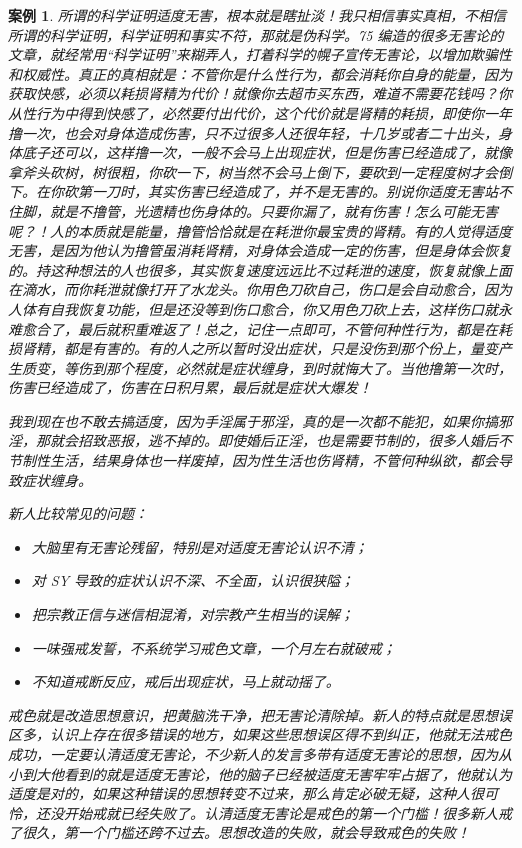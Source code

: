 \documentclass{ctexart}
\newtheorem{case}{案例}
\begin{document}
\begin{case}
    所谓的科学证明适度无害，根本就是瞎扯淡！我只相信事实真相，不相信所谓的科学证明，科学证明和事实不符，那就是伪科学。75 编造的很多无害论的文章，就经常用“科学证明”来糊弄人，打着科学的幌子宣传无害论，以增加欺骗性和权威性。真正的真相就是：不管你是什么性行为，都会消耗你自身的能量，因为获取快感，必须以耗损肾精为代价！就像你去超市买东西，难道不需要花钱吗？你从性行为中得到快感了，必然要付出代价，这个代价就是肾精的耗损，即使你一年撸一次，也会对身体造成伤害，只不过很多人还很年轻，十几岁或者二十出头，身体底子还可以，这样撸一次，一般不会马上出现症状，但是伤害已经造成了，就像拿斧头砍树，树很粗，你砍一下，树当然不会马上倒下，要砍到一定程度树才会倒下。在你砍第一刀时，其实伤害已经造成了，并不是无害的。别说你适度无害站不住脚，就是不撸管，光遗精也伤身体的。只要你漏了，就有伤害！怎么可能无害呢？！人的本质就是能量，撸管恰恰就是在耗泄你最宝贵的肾精。有的人觉得适度无害，是因为他认为撸管虽消耗肾精，对身体会造成一定的伤害，但是身体会恢复的。持这种想法的人也很多，其实恢复速度远远比不过耗泄的速度，恢复就像上面在滴水，而你耗泄就像打开了水龙头。你用色刀砍自己，伤口是会自动愈合，因为人体有自我恢复功能，但是还没等到伤口愈合，你又用色刀砍上去，这样伤口就永难愈合了，最后就积重难返了！总之，记住一点即可，不管何种性行为，都是在耗损肾精，都是有害的。有的人之所以暂时没出症状，只是没伤到那个份上，量变产生质变，等伤到那个程度，必然就是症状缠身，到时就悔大了。当他撸第一次时，伤害已经造成了，伤害在日积月累，最后就是症状大爆发！

    我到现在也不敢去搞适度，因为手淫属于邪淫，真的是一次都不能犯，如果你搞邪淫，那就会招致恶报，逃不掉的。即使婚后正淫，也是需要节制的，很多人婚后不节制性生活，结果身体也一样废掉，因为性生活也伤肾精，不管何种纵欲，都会导致症状缠身。

    新人比较常见的问题：

    \begin{itemize}
        \item 大脑里有无害论残留，特别是对适度无害论认识不清；
        \item 对 SY 导致的症状认识不深、不全面，认识很狭隘；
        \item 把宗教正信与迷信相混淆，对宗教产生相当的误解；
        \item 一味强戒发誓，不系统学习戒色文章，一个月左右就破戒；
        \item 不知道戒断反应，戒后出现症状，马上就动摇了。
    \end{itemize}

    戒色就是改造思想意识，把黄脑洗干净，把无害论清除掉。新人的特点就是思想误区多，认识上存在很多错误的地方，如果这些思想误区得不到纠正，他就无法戒色成功，一定要认清适度无害论，不少新人的发言多带有适度无害论的思想，因为从小到大他看到的就是适度无害论，他的脑子已经被适度无害牢牢占据了，他就认为适度是对的，如果这种错误的思想转变不过来，那么肯定必破无疑，这种人很可怜，还没开始戒就已经失败了。认清适度无害论是戒色的第一个门槛！很多新人戒了很久，第一个门槛还跨不过去。思想改造的失败，就会导致戒色的失败！
\end{case}
\end{document}
